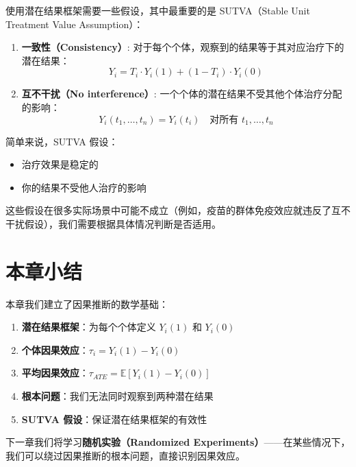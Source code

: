 使用潜在结果框架需要一些假设，其中最重要的是 SUTVA（Stable Unit Treatment Value Assumption）：

\begin{Theorem}[SUTVA]
  \begin{enumerate}
    \item \textbf{一致性（Consistency）}: 对于每个个体，观察到的结果等于其对应治疗下的潜在结果：
      \[
      Y_i = T_i \cdot Y_i(1) + (1 - T_i) \cdot Y_i(0)
      \]
    \item \textbf{互不干扰（No interference）}: 一个个体的潜在结果不受其他个体治疗分配的影响：
      \[
      Y_i(t_1, \ldots, t_n) = Y_i(t_i) \quad \text{对所有 } t_1, \ldots, t_n
      \]
  \end{enumerate}
\end{Theorem}

简单来说，SUTVA 假设：
\begin{itemize}
  \item 治疗效果是稳定的
  \item 你的结果不受他人治疗的影响
\end{itemize}

这些假设在很多实际场景中可能不成立（例如，疫苗的群体免疫效应就违反了互不干扰假设），我们需要根据具体情况判断是否适用。

\section{本章小结}

本章我们建立了因果推断的数学基础：

\begin{enumerate}
  \item \textbf{潜在结果框架}：为每个个体定义 $Y_i(1)$ 和 $Y_i(0)$
  \item \textbf{个体因果效应}：$\tau_i = Y_i(1) - Y_i(0)$
  \item \textbf{平均因果效应}：$\tau_{ATE} = \mathbb{E}[Y_i(1) - Y_i(0)]$
  \item \textbf{根本问题}：我们无法同时观察到两种潜在结果
  \item \textbf{SUTVA 假设}：保证潜在结果框架的有效性
\end{enumerate}

下一章我们将学习\textbf{随机实验（Randomized Experiments）}——在某些情况下，我们可以绕过因果推断的根本问题，直接识别因果效应。

